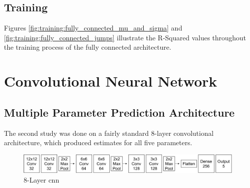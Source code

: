 \documentclass[11pt,oneside,openany,a4paper,english, report, goldenblock
]{usthesis}
\begin{document}
\subsection{Training}
\begin{figure}[h]
\end{figure}

Figures \ref{fig:training:fully_connected_mu_and_sigma} and \ref{fig:training:fully_connected_jumps} illustrate the R-Squared values throughout the training process of the fully connected architecture.

\section{Convolutional Neural Network}

\subsection{Multiple Parameter Prediction Architecture}
\label{chap:ConvolutionalNeuralNetwork-section:MultipleParameterPredictionArchitecture}
The second study was done on a fairly standard 8-layer convolutional architecture, which produced estimates for all five parameters.

\begin{figure}[h]
	\centering
	\includegraphics[width=1\linewidth]{Images/Diagrams/Network-Structures/MultipleOutputCNN}
	\caption[Multiple Output Prediction \acrshort{cnn}]{8-Layer \acrshort{cnn}}
	\label{fig:multipleoutputcnn}
\end{figure}
\end{document}
